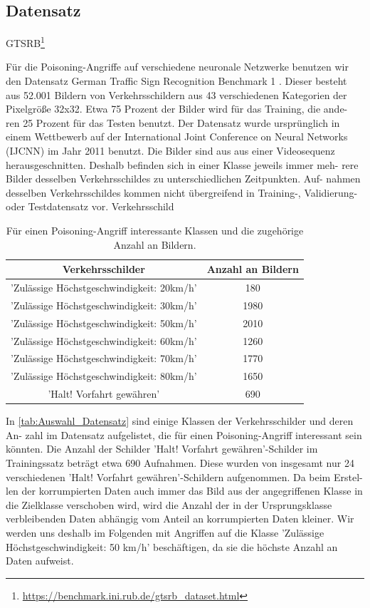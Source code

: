 \documentclass[twoside, 11pt,a4paper]{article}
\numberwithin{equation}{section}
\begin{document}
	\subsection{Datensatz}
	GTSRB\footnote{\url{https://benchmark.ini.rub.de/gtsrb_dataset.html}}
	
	Für die Poisoning-Angriffe auf verschiedene neuronale Netzwerke benutzen wir
	den Datensatz German Traffic Sign Recognition Benchmark 1 . Dieser besteht
	aus 52.001 Bildern von Verkehrsschildern aus 43 verschiedenen Kategorien der
	Pixelgröße 32x32. Etwa 75 Prozent der Bilder wird für das Training, die ande-
	ren 25 Prozent für das Testen benutzt. Der Datensatz wurde ursprünglich in
	einem Wettbewerb auf der International Joint Conference on Neural Networks
	(IJCNN) im Jahr 2011 benutzt. Die Bilder sind aus aus einer Videosequenz
	herausgeschnitten. Deshalb befinden sich in einer Klasse jeweils immer meh-
	rere Bilder desselben Verkehrsschildes zu unterschiedlichen Zeitpunkten. Auf-
	nahmen desselben Verkehrsschildes kommen nicht übergreifend in Training-,
	Validierung- oder Testdatensatz vor.
	Verkehrsschild
	\begin{table}[h]
		\begin{tabular}[h]{c|c}
			Verkehrsschilder & Anzahl an Bildern \\ \hline
			’Zulässige Höchstgeschwindigkeit: 20km/h’& 180 \\
			’Zulässige Höchstgeschwindigkeit: 30km/h’ & 1980 \\
			’Zulässige Höchstgeschwindigkeit: 50km/h’	& 2010 \\
			’Zulässige Höchstgeschwindigkeit: 60km/h’	& 1260 \\
			’Zulässige Höchstgeschwindigkeit: 70km/h’	& 1770 \\
			’Zulässige Höchstgeschwindigkeit: 80km/h’	&1650 \\
			’Halt! Vorfahrt gewähren’					&	690
		\end{tabular}
		\label{tab:Auswahl_Datensatz}
		\caption{Für einen Poisoning-Angriff interessante Klassen und die zugehörige Anzahl an Bildern.}
	\end{table}
	
	
	
	
	
	
	
	
	In \autoref{tab:Auswahl_Datensatz} sind einige Klassen der Verkehrsschilder und deren An-
	zahl im Datensatz aufgelistet, die für einen Poisoning-Angriff interessant sein
	könnten. Die Anzahl der Schilder ’Halt! Vorfahrt gewähren’-Schilder im Trainingssatz beträgt etwa 690 Aufnahmen. Diese wurden von insgesamt nur 24 verschiedenen ’Halt! Vorfahrt gewähren’-Schildern aufgenommen. Da beim Erstel-
	len der korrumpierten Daten auch immer das Bild aus der angegriffenen Klasse
	in die Zielklasse verschoben wird, wird die Anzahl der in der Ursprungsklasse verbleibenden Daten abhängig vom Anteil an korrumpierten Daten kleiner.
	Wir werden uns deshalb im Folgenden mit Angriffen auf die Klasse ’Zulässige
	Höchstgeschwindigkeit: 50 km/h’ beschäftigen, da sie die höchste Anzahl an
	Daten aufweist.
	
\end{document}
